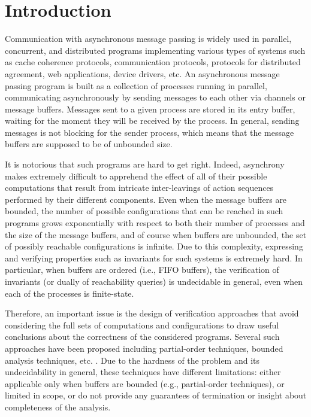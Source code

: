 \section{Introduction}

Communication with asynchronous message passing is widely used in parallel, concurrent, and distributed programs implementing various types of systems such as cache coherence protocols, communication protocols, protocols for distributed agreement, web applications, device drivers, etc. 
%
An asynchronous message passing program is built as a collection of processes running in parallel, communicating asynchronously by sending messages to each other via channels or message buffers. Messages sent to a given process are stored in its entry buffer, waiting for the moment they will be received by the process. In general, sending messages is not blocking for the sender process, which means that the message buffers are supposed to be of unbounded size. 

It is notorious that such programs are hard to get right. Indeed, asynchrony makes extremely difficult to apprehend the effect of all of their possible computations that result from intricate inter-leavings of action sequences performed by their different components. Even when the message buffers are bounded, the number of possible configurations that can be reached in such programs grows exponentially with respect to both their number of processes and the size of the message buffers, and of course when buffers are unbounded, the set of possibly reachable configurations is infinite. Due to this complexity, expressing and verifying properties such as invariants for such systems is extremely hard. In particular, when buffers are ordered (i.e., FIFO buffers), the verification of invariants (or dually of reachability queries) is undecidable in general, even when each of the processes is finite-state.

Therefore, an important issue is the design of verification approaches that avoid considering the full sets of computations and configurations to draw useful conclusions about the correctness of the considered programs. Several such approaches have been proposed including partial-order techniques, bounded analysis techniques, etc. \cite{}. Due to the hardness of the problem and its undecidability in general, these techniques have different limitations: either applicable only when buffers are bounded (e.g., partial-order techniques), or limited in scope, or do not provide any guarantees of termination or insight about completeness of the analysis.


